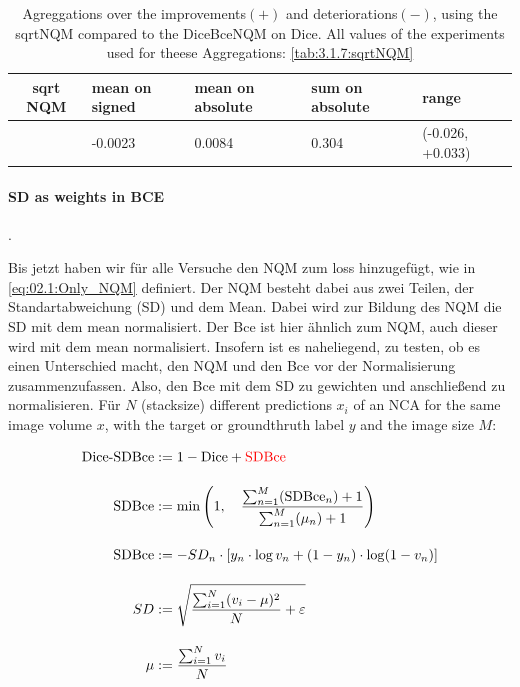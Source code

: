 \begin{table}[h!]
    \centering
    \begin{tabular}{|c|l|l|l|l|}
        \hline
        \bfseries sqrt NQM & mean on signed & mean on absolute & sum on absolute & range\\\hline
        & -0.0023 & 0.0084 & 0.304 & (-0.026, +0.033)\\\hline
    \end{tabular}
    \caption{Agreggations over the improvements$(+)$ and deteriorations$(-)$, using the sqrtNQM compared to the DiceBceNQM on Dice. All values of the experiments used for theese Aggregations: \autoref{tab:3.1.7:sqrtNQM}}
    \label{tab:3.1.7:sqrtNQM_aggregated}
\end{table}
\iftable

\fi
\iffalse
\paragraph{SD as weights in BCE}
\label{experiments:03.1.8:backbone_hippo:stdd BCE}
.\\

Bis jetzt haben wir für alle Versuche den NQM zum loss hinzugefügt, wie in \autoref{eq:02.1:Only_NQM} definiert. Der NQM besteht dabei aus zwei Teilen, der Standartabweichung (SD) und dem Mean. Dabei wird zur Bildung des NQM die SD mit dem mean normalisiert. Der Bce ist hier ähnlich zum NQM, auch dieser wird mit dem mean normalisiert. Insofern ist es naheliegend, zu testen, ob es einen Unterschied macht, den NQM und den Bce vor der Normalisierung zusammenzufassen. Also, den Bce mit dem SD zu gewichten und anschließend zu normalisieren. Für $N$ (stacksize) different predictions $x_i$ of an NCA for the same image volume $x$, with the target or groundthruth label $y$ and the image size $M$:

\begin{align*}
    \text{Dice-SDBce} &:= 1 - \mathrm{Dice} + {\color{red}\mathrm{SDBce}}\\[10pt]
    \text{SDBce}      &:=\min\left(1, \quad \frac{\sum_{n=1}^M (\text{SDBce}_n) +1} {\sum_{n=1}^M (\mu_n) +1}\right)\\[10pt]
    \text{SDBce}      &:=  - SD_n \cdot [y_n \cdot \log v_n + (1-y_n) \cdot \log (1-v_n)]\\[10pt]
    SD                &:= \sqrt{\frac{\sum^N_{i=1}(v_i-\mu)^2}  {N} + \varepsilon}\\[10pt]
    \mu               &:= \frac{\sum^N_{i=1}v_i}  {N}
\end{align*}

